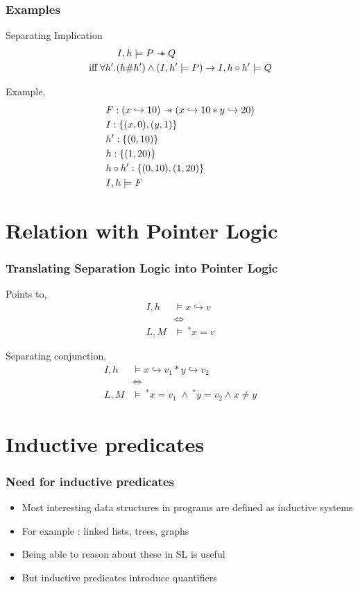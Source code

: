 \documentclass{beamer}
\newcommand\sepimp{\mathrel{-\mkern-6mu*}}
\begin{document}
\begin{frame}
\frametitle{Examples}
Separating Implication
\begin{align*}
    I,h \models P \sepimp Q \hspace{3.5cm} \\ 
    \textrm{iff} \; \forall h'.(h \# h') \land (I,h' \models P) \to I,h \circ h' \models Q
\end{align*}

Example,
\begin{align*}
    & F : (x \hookrightarrow 10) \sepimp (x \hookrightarrow 10 * y \hookrightarrow 20) \\
    & I : \{(x,0), (y,1)\} \\
    & h' : \{(0,10)\} \\
    & h : \{(1,20) \} \\
    & h \circ h' : \{(0,10), (1,20)\} \\
    & I,h \models F
\end{align*}
\end{frame}

\section{Relation with Pointer Logic}

\begin{frame}
\frametitle{Translating Separation Logic into Pointer Logic}
Points to,
\begin{align*}
    I,h & \models x \hookrightarrow v \\
    & \Longleftrightarrow \\
    L,M & \models \ ^*x = v
\end{align*}

Separating conjunction,
\begin{align*}
    I,h & \models x \hookrightarrow v_1 * y \hookrightarrow v_2 \\
    & \Longleftrightarrow \\
    L,M & \models \ ^*x = v_1 \; \land \ ^*y = v_2 \land x \neq y
\end{align*}
\end{frame}

\section{Inductive predicates}
\begin{frame}
\frametitle{Need for inductive predicates}
\begin{itemize}
    \item Most interesting data structures in programs are defined as inductive systems
    \item For example : linked lists, trees, graphs
    \item Being able to reason about these in SL is useful
    \item But inductive predicates introduce quantifiers
\end{itemize}
\end{frame}
\end{document}
